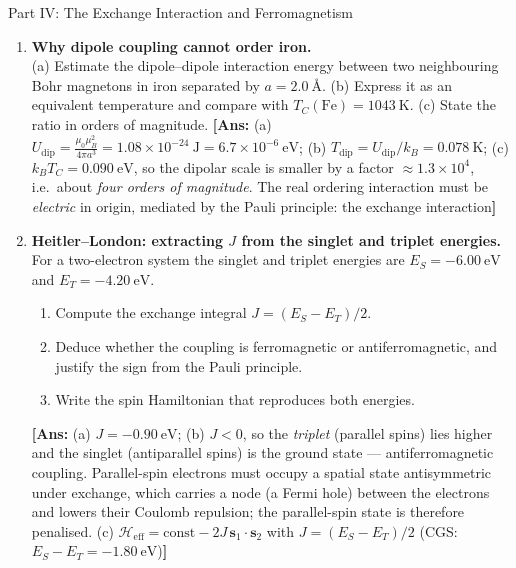 \documentclass[11pt,a4paper]{article}
\newcommand{\vb}[1]{\mathbf{#1}}
\newcommand{\Ang}{\text{\AA}}
\begin{document}
\begin{assignmentbox}{Part IV: The Exchange Interaction and Ferromagnetism}
\begin{enumerate}[label=\textbf{IV.\arabic*.}, leftmargin=*]
    \item \textbf{Why dipole coupling cannot order iron.}\\
    (a) Estimate the dipole--dipole interaction energy between two neighbouring Bohr magnetons in iron separated by $a = 2.0\ \Ang$.
    (b) Express it as an equivalent temperature and compare with $T_C(\mathrm{Fe}) = 1043\ \mathrm{K}$.
    (c) State the ratio in orders of magnitude.
    \textbf{[Ans:} (a) $U_{\mathrm{dip}} = \frac{\mu_0\mu_B^2}{4\pi a^3} = 1.08\times10^{-24}\ \mathrm{J} = 6.7\times10^{-6}\ \mathrm{eV}$; (b) $T_{\mathrm{dip}} = U_{\mathrm{dip}}/k_B = 0.078\ \mathrm{K}$; (c) $k_BT_C = 0.090\ \mathrm{eV}$, so the dipolar scale is smaller by a factor $\approx 1.3\times10^{4}$, i.e.\ about \emph{four orders of magnitude}. The real ordering interaction must be \emph{electric} in origin, mediated by the Pauli principle: the exchange interaction\textbf{]}

    \item \textbf{Heitler--London: extracting $J$ from the singlet and triplet energies.}\\
    For a two-electron system the singlet and triplet energies are $E_S = -6.00\ \mathrm{eV}$ and $E_T = -4.20\ \mathrm{eV}$.
    \begin{enumerate}[label=(\alph*)]
        \item Compute the exchange integral $J = (E_S - E_T)/2$.
        \item Deduce whether the coupling is ferromagnetic or antiferromagnetic, and justify the sign from the Pauli principle.
        \item Write the spin Hamiltonian that reproduces both energies.
    \end{enumerate}
    \textbf{[Ans:} (a) $J = -0.90\ \mathrm{eV}$; (b) $J < 0$, so the \emph{triplet} (parallel spins) lies higher and the singlet (antiparallel spins) is the ground state --- antiferromagnetic coupling. Parallel-spin electrons must occupy a spatial state antisymmetric under exchange, which carries a node (a Fermi hole) between the electrons and lowers their Coulomb repulsion; the parallel-spin state is therefore penalised. (c) $\mathcal{H}_{\mathrm{eff}} = \text{const} - 2J\,\vb{s}_1\cdot\vb{s}_2$ with $J = (E_S-E_T)/2$ (CGS: $E_S - E_T = -1.80\ \mathrm{eV}$)\textbf{]}


\end{enumerate}
\end{assignmentbox}
\end{document}
